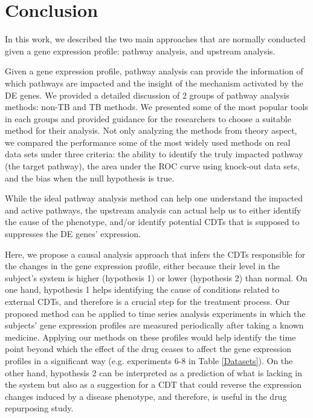 \section{Conclusion}

In this work, we described the two main approaches that are normally conducted given a gene expression profile: pathway analysis, and upstream analysis.

Given a gene expression profile, pathway analysis can provide the information of which pathways are impacted and the insight of the mechanism activated by the DE genes. We provided a detailed discussion of 2 groups of pathway analysis methods: non-TB and TB methods. We presented some of the most popular tools in each groups and provided guidance for the researchers to choose a suitable method for their analysis. Not only analyzing the methods from theory aspect, we compared the performance some of the most widely used methods on real data sets under three criteria: the ability to identify the truly impacted pathway (the target pathway), the area under the ROC curve using knock-out data sets, and the bias when the null hypothesis is true.

While the ideal pathway analysis method can help one understand the impacted and active pathways, the upstream analysis can actual help us to either identify the cause of the phenotype, and/or identify potential CDTs that is supposed to suppresses the DE genes' expression. 

Here, we propose a causal analysis approach that infers the CDTs responsible for the changes in the gene expression profile, either because their level in the subject's system is higher (hypothesis 1) or lower (hypothesis 2) than normal. 
On one hand,  hypothesis 1 helps identifying the cause of conditions related to external CDTs, and therefore is a crucial step for the treatment process. 
Our proposed method can be applied to time series analysis experiments in which the subjects' gene expression profiles are measured periodically after taking a known medicine. Applying our methods on these profiles would help identify the time point beyond which the effect of the drug ceases to affect the gene expression profiles in a significant way  (e.g. experiments 6-8 in Table \ref{Datasets}).
On the other hand, hypothesis 2 can be interpreted as a prediction of what is lacking in the system but also as a suggestion for a CDT that could reverse the expression changes induced by a disease phenotype, and therefore, is useful in the drug repurposing study. %




